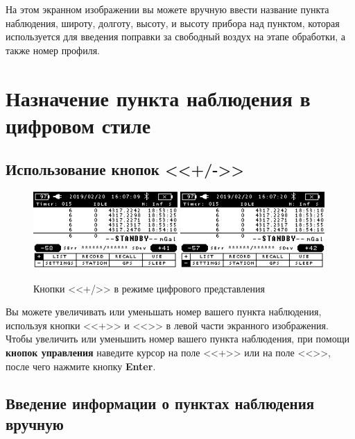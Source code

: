 На этом экранном изображении вы можете вручную ввести название пункта
наблюдения, широту, долготу, высоту, и высоту прибора над пунктом, которая
используется для введения поправки за свободный воздух на этапе обработки, а
также номер профиля.

\section[Назначение пункта в цифровом стиле]{Назначение пункта наблюдения в цифровом стиле}


\subsection{Использование кнопок <<+/->>}

\begin{figure}[h]
  \centering
  \includegraphics[width=0.49\textwidth]{figures/+_-_buttons_in_numeric_mode_1}
  \includegraphics[width=0.49\textwidth]{figures/+_-_buttons_in_numeric_mode_2}
  \caption{Кнопки <<+/\textminus{}>> в режиме цифрового представления}
  \label{fig:+_-_buttons_in_numeric_mode}
\end{figure}

Вы можете увеличивать или уменьшать номер вашего пункта наблюдения, используя
кнопки <<+>> и <<\textminus{}>> в левой части экранного изображения. Чтобы
увеличить или уменьшить номер вашего пункта наблюдения, при помощи
\textbf{кнопок управления} наведите курсор на поле <<+>> или на поле
<<\textminus{}>>, после чего нажмите кнопку \textbf{Enter}.

\subsection[Введение информации о пунктах вручную]{Введение информации о пунктах наблюдения вручную}

